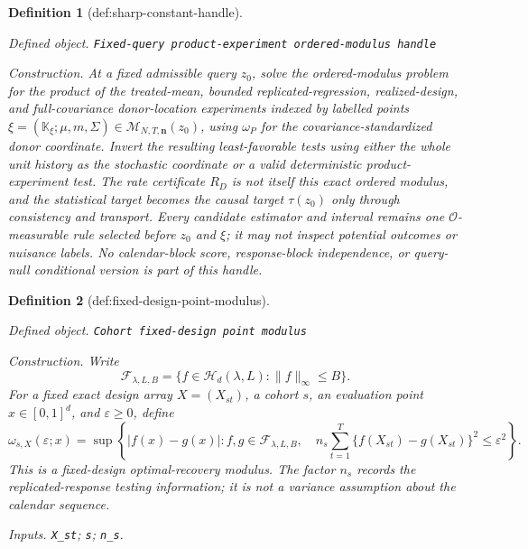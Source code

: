 \documentclass{article}
\newtheorem{definition}{Definition}
\begin{document}
\begin{definition}[def:sharp-constant-handle]\label{def:sharp-constant-handle}
\par\smallskip\noindent\emph{Defined object.} \texttt{Fixed-\allowbreak{}query product-\allowbreak{}experiment ordered-\allowbreak{}modulus handle}
\par\smallskip\noindent\emph{Construction.} At a fixed admissible query \(z_0\), solve the ordered-modulus problem for the product of the treated-mean, bounded replicated-regression, realized-design, and full-covariance donor-location experiments indexed by labelled points
\(\xi=(\mathbb K_\xi;\mu,m,\Sigma)\in
\mathcal M_{N,T,\mathbf n}(z_0)\), using \(\omega_P\) for the covariance-standardized donor coordinate.  Invert the resulting least-favorable tests using either the whole unit history as the stochastic coordinate or a valid deterministic product-experiment test.  The rate certificate \(R_D\) is not itself this exact ordered modulus, and the statistical target becomes the causal target \(\tau(z_0)\) only through consistency and transport.  Every candidate estimator and interval remains one \(\mathcal O\)-measurable rule selected before \(z_0\) and \(\xi\); it may not inspect potential outcomes or nuisance labels.  No calendar-block score, response-block independence, or query-null conditional version is part of this handle.
\end{definition}

\begin{definition}[def:fixed-design-point-modulus]\label{def:fixed-design-point-modulus}
\par\smallskip\noindent\emph{Defined object.} \texttt{Cohort fixed-\allowbreak{}design point modulus}
\par\smallskip\noindent\emph{Construction.} Write
\[
 \mathcal F_{\lambda,L,B}
 =\{f\in\mathcal H_d(\lambda,L):\|f\|_\infty\le B\}.
\]
For a fixed exact design array \(X=(X_{st})\), a cohort \(s\), an
evaluation point \(x\in[0,1]^d\), and \(\varepsilon\ge0\), define
\[
 \omega_{s,X}(\varepsilon;x)
 =\sup\left\{|f(x)-g(x)|:
 f,g\in\mathcal F_{\lambda,L,B},\quad
 n_s\sum_{t=1}^{T}\{f(X_{st})-g(X_{st})\}^2\le\varepsilon^2
 \right\}.
\]
This is a fixed-design optimal-recovery modulus.  The factor \(n_s\)
records the replicated-response testing information; it is not a variance
assumption about the calendar sequence.
\par\smallskip\noindent\emph{Inputs.} \texttt{X\_\allowbreak{}st}; \texttt{s}; \texttt{n\_\allowbreak{}s}.
\end{definition}
\end{document}
